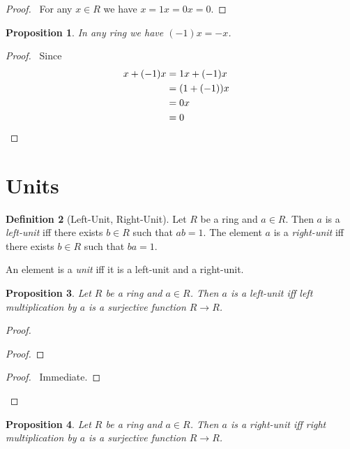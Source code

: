 \documentclass{book}
\let\qed\relax
\newtheorem{prop}{Proposition}[chapter]
\theoremstyle{definition}
\newtheorem{df}[prop]{Definition}
\begin{document}
\begin{proof}
\pf\ For any $x \in R$ we have $x = 1x = 0x = 0$. \qed
\end{proof}

\begin{prop}
In any ring we have $(-1)x = -x$.
\end{prop}

\begin{proof}
\pf\ Since
\begin{align*}
x + (-1)x & = 1x + (-1) x \\
& = (1 + (-1))x \\
& = 0x \\
& = 0 & \qed
\end{align*}
\end{proof}

\section{Units}

\begin{df}[Left-Unit, Right-Unit]
Let $R$ be a ring and $a \in R$. Then $a$ is a \emph{left-unit} iff there exists $b \in R$ such that $ab = 1$. The element $a$ is a \emph{right-unit} iff there exists $b \in R$ such that $ba = 1$.

An element is a \emph{unit} iff it is a left-unit and a right-unit.
\end{df}

\begin{prop}
Let $R$ be a ring and $a \in R$. Then $a$ is a left-unit iff left multiplication by $a$ is a surjective function $R \rightarrow R$.
\end{prop}

\begin{proof}
\pf
{}
\begin{proof}
\end{proof}
\begin{proof}
	\pf\ Immediate.
\end{proof}
\qed
\end{proof}

\begin{prop}
Let $R$ be a ring and $a \in R$. Then $a$ is a right-unit iff right multiplication by $a$ is a surjective function $R \rightarrow R$.
\end{prop}
\end{document}
